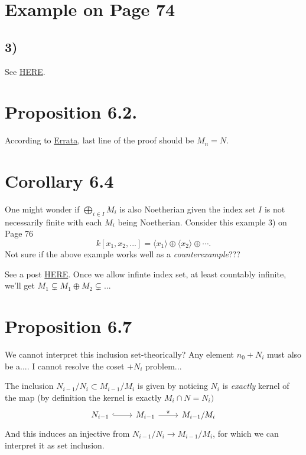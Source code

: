 \section{Example on Page 74}
\subsection{3)}
See \href{https://math.stackexchange.com/questions/173230/example-of-artinian-module-that-is-not-noetherian}{HERE}.

\section{Proposition 6.2.}

According to \href{https://mathoverflow.net/questions/42241/errata-for-atiyah-macdonald}{Errata}, last line of the proof should be $M_n=N$.

\section{Corollary 6.4}

One might wonder if $\bigoplus_{i\in I}M_i$ is also Noetherian given the index set $I$ is not necessarily finite with each $M_i$ being Noetherian. 
Consider this example 3) on Page 76
$$k[x_1,x_2,...]=\langle x_1\rangle \oplus\langle x_2\rangle\oplus\cdots.$$
Not sure if the above example works well as a \textit{counterexample}???

See a post \href{https://math.stackexchange.com/questions/173614/question-about-direct-sum-of-noetherian-modules-is-noetherian}{HERE}. 
Once we allow infinte index set, at least countably infinite, we'll get $M_1\subsetneq M_1\oplus M_2\subsetneq...$

\section{Proposition 6.7}

We cannot interpret this inclusion set-theorically? Any element $n_{0}+N_i$ must also be a.... I cannot resolve the coset $+N_i$ problem... 

The inclusion $N_{i-1}/N_i\subset M_{i-1}/M_i$ is given by noticing $N_i$ is \textit{exactly} kernel of the map (by definition the kernel is exactly $M_i\cap N=N_{i})$
\[\begin{tikzcd}
	{N_{i-1}} & {M_{i-1}} & {M_{i-1}/M_i}
	\arrow[hook, from=1-1, to=1-2]
	\arrow["\pi", from=1-2, to=1-3]
\end{tikzcd}\]
And this induces an injective from $N_{i-1}/N_i\to M_{i-1}/M_i$, for which we can interpret it as set inclusion.

